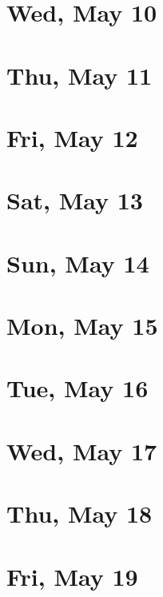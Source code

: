 	\section{Wed, May 10}
		
		
	\section{Thu, May 11}
		
		
	\section{Fri, May 12}
		
		
	\section{Sat, May 13}
		
		
	\section{Sun, May 14}
		
		
	\section{Mon, May 15}
		
		
	\section{Tue, May 16}
		
		
	\section{Wed, May 17}
		
		
	\section{Thu, May 18}
		
		
	\section{Fri, May 19}
		
		
